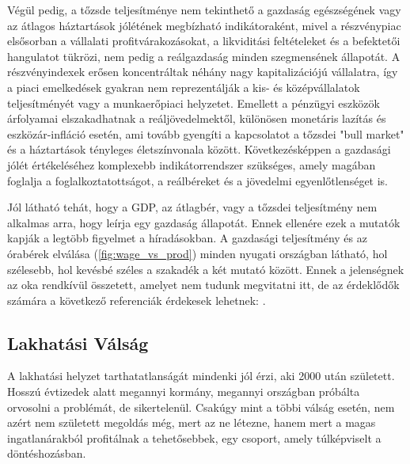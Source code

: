 Végül pedig, a tőzsde teljesítménye nem tekinthető a gazdaság egészségének vagy
az átlagos háztartások jólétének megbízható indikátoraként, mivel a részvénypiac
elsősorban a vállalati profitvárakozásokat, a likviditási feltételeket és a befektetői
hangulatot tükrözi, nem pedig a reálgazdaság minden szegmensének állapotát. A
részvényindexek erősen koncentráltak néhány nagy kapitalizációjú vállalatra, így a
piaci emelkedések gyakran nem reprezentálják a kis- és középvállalatok teljesítményét
vagy a munkaerőpiaci helyzetet. Emellett a pénzügyi eszközök árfolyamai elszakadhatnak
a reáljövedelmektől, különösen monetáris lazítás és eszközár-infláció esetén,
ami tovább gyengíti a kapcsolatot a tőzsdei "bull market" és a háztartások tényleges
életszínvonala között. Következésképpen a gazdasági jólét értékeléséhez komplexebb
indikátorrendszer szükséges, amely magában foglalja a foglalkoztatottságot, a reálbéreket
és a jövedelmi egyenlőtlenséget is.

Jól látható tehát, hogy a GDP, az átlagbér, vagy a tőzsdei teljesítmény nem alkalmas
arra, hogy leírja egy gazdaság állapotát.  Ennek ellenére ezek a mutatók kapják a legtöbb
figyelmet a híradásokban. A gazdasági teljesítmény és az órabérek elválása (\cref{fig:wage_vs_prod})
minden nyugati országban látható, hol szélesebb, hol kevésbé széles a szakadék a két mutató között.
Ennek a jelenségnek az oka rendkívül összetett, amelyet nem tudunk megvitatni itt, de az
érdeklődők számára a következő referenciák érdekesek lehetnek: \cite{wage_2, wage_3}.



\subsection{Lakhatási Válság}

A lakhatási helyzet tarthatatlanságát mindenki jól érzi, aki 2000 után született. Hosszú
évtizedek alatt megannyi kormány, megannyi országban próbálta orvosolni a problémát,
de sikertelenül. Csakúgy mint a többi válság esetén, nem azért nem született megoldás
még, mert az ne létezne, hanem mert a magas ingatlanárakból profitálnak a tehetősebbek,
egy csoport, amely túlképviselt a döntéshozásban.

